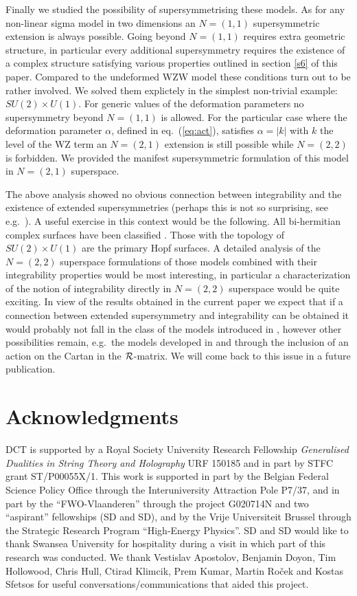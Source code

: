 \documentclass[12pt]{article}
\begin{document}
Finally we studied the possibility of supersymmetrising these models. As for any non-linear sigma model in two dimensions an $N=(1,1)$ supersymmetric extension is always possible. Going beyond $N=(1,1)$ requires extra geometric structure, in particular every additional supersymmetry requires the existence of a complex structure satisfying various properties outlined in section \ref{s6} of this paper. Compared to the undeformed WZW model these conditions turn out to be rather involved. We solved them explictely in the simplest non-trivial example: $SU(2)\times U(1)$. For generic values of the deformation parameters no supersymmetry beyond $N=(1,1)$ is allowed. For the particular case where the deformation parameter $\alpha $, defined in eq.~(\ref{eq:act}), satisfies $\alpha =|k|$ with $k$ the level of the WZ term an $N=(2,1)$ extension is still possible while $N=(2,2)$ is forbidden. We provided the manifest supersymmetric formulation of this model in $N=(2,1)$ superspace. 

The above analysis showed no obvious connection between integrability and the existence of extended supersymmetries (perhaps this is not so surprising, see e.g.\ \cite{Figueirido:1988ct}). A useful exercise in this context would be the following. All bi-hermitian complex surfaces have been classified \cite{aposto}. Those with the topology of $SU(2)\times U(1)$ are the primary Hopf surfaces. A detailed analysis of the $N=(2,2)$ superspace formulations of those models combined with their integrability properties would be most interesting, in particular a characterization of the notion of integrability directly in $N=(2,2)$ superspace would be quite exciting. In view of the results obtained in the current paper we expect that if a connection between extended supersymmetry and integrability can be obtained it would probably not fall in the class of the models introduced in \cite{Delduc:2014uaa}, however other possibilities remain, e.g.\ the models developed in \cite{Delduc:2017fib} and through the inclusion of an action on the Cartan in the ${\cal R}$-matrix. We will come back to this issue in a future publication. 

 \section*{Acknowledgments}

\noindent
DCT is supported by a Royal Society University Research Fellowship {\em Generalised Dualities in String Theory and Holography} URF 150185 and in part by STFC grant ST/P00055X/1. This work is supported in part by the Belgian Federal Science Policy Office through the Interuniversity Attraction Pole P7/37, and in part by the ``FWO-Vlaanderen'' through the project G020714N and two ``aspirant'' fellowships (SD and SD), and by the Vrije Universiteit Brussel through the Strategic Research Program ``High-Energy Physics''.  SD and SD would like to thank Swansea University for hospitality during a visit in which part of this research was conducted.   We thank Vestislav Apostolov, Benjamin Doyon, Tim Hollowood, Chris Hull, Ctirad Klimcik, Prem Kumar, Martin Ro\v cek and Kostas Sfetsos for useful conversations/communications that aided this project. 
 \appendix
\appendixpage
 
\end{document}
